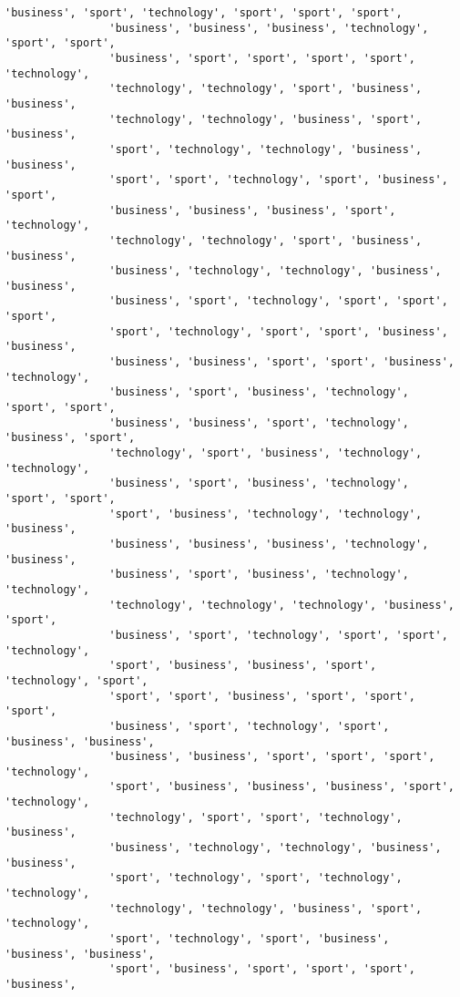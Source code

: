 \documentclass[11pt]{article}
\begin{document}
\begin{Verbatim}[commandchars=\\\{\}]
                'business', 'sport', 'technology', 'sport', 'sport', 'sport',
                'business', 'business', 'business', 'technology', 'sport', 'sport',
                'business', 'sport', 'sport', 'sport', 'sport', 'technology',
                'technology', 'technology', 'sport', 'business', 'business',
                'technology', 'technology', 'business', 'sport', 'business',
                'sport', 'technology', 'technology', 'business', 'business',
                'sport', 'sport', 'technology', 'sport', 'business', 'sport',
                'business', 'business', 'business', 'sport', 'technology',
                'technology', 'technology', 'sport', 'business', 'business',
                'business', 'technology', 'technology', 'business', 'business',
                'business', 'sport', 'technology', 'sport', 'sport', 'sport',
                'sport', 'technology', 'sport', 'sport', 'business', 'business',
                'business', 'business', 'sport', 'sport', 'business', 'technology',
                'business', 'sport', 'business', 'technology', 'sport', 'sport',
                'business', 'business', 'sport', 'technology', 'business', 'sport',
                'technology', 'sport', 'business', 'technology', 'technology',
                'business', 'sport', 'business', 'technology', 'sport', 'sport',
                'sport', 'business', 'technology', 'technology', 'business',
                'business', 'business', 'business', 'technology', 'business',
                'business', 'sport', 'business', 'technology', 'technology',
                'technology', 'technology', 'technology', 'business', 'sport',
                'business', 'sport', 'technology', 'sport', 'sport', 'technology',
                'sport', 'business', 'business', 'sport', 'technology', 'sport',
                'sport', 'sport', 'business', 'sport', 'sport', 'sport',
                'business', 'sport', 'technology', 'sport', 'business', 'business',
                'business', 'business', 'sport', 'sport', 'sport', 'technology',
                'sport', 'business', 'business', 'business', 'sport', 'technology',
                'technology', 'sport', 'sport', 'technology', 'business',
                'business', 'technology', 'technology', 'business', 'business',
                'sport', 'technology', 'sport', 'technology', 'technology',
                'technology', 'technology', 'business', 'sport', 'technology',
                'sport', 'technology', 'sport', 'business', 'business', 'business',
                'sport', 'business', 'sport', 'sport', 'sport', 'business',

\end{Verbatim}
\end{document}
